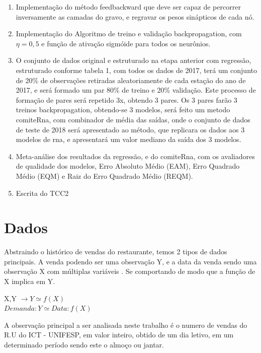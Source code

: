 \documentclass[	12pt, Times, openright, twoside, a4paper, english, brazil]{abntex2}
\begin{document}
\begin{enumerate}
    \item Implementação do método feedbackward que deve ser capaz de percorrer inversamente as camadas do gravo, e regravar os pesos sinápticos de cada nó.

    \item Implementação do Algoritmo de treino e validação backpropagation, com $\eta = 0,5$ e função de ativação sigmóide para todos os neurônios.

    \item O conjunto de dados original e estruturado na etapa anterior com regressão, estruturado conforme tabela 1, com todos os dados de 2017, terá um conjunto de 20\% de observações retiradas aleatoriamente de cada estação do ano de 2017, e será formado um par 80\% de treino e 20\% validação. Este processo de formação de pares será repetido 3x, obtendo 3 pares.
    Os 3 pares farão 3 treinos backpropagation, obtendo-se 3 modelos, será feito um metodo comiteRna, com combinador de média das saídas, onde o conjunto de dados de teste de 2018 será apresentado ao método, que replicara os dados aos 3 modelos de rna, e apresentará um valor mediano da saída dos 3 modelos.
    
    \item Meta-análise dos resultados da regressão, e do comiteRna, com os avaliadores de qualidade dos modelos, Erro Absoluto Médio (EAM), Erro Quadrado Médio (EQM) e Raiz do Erro Quadrado Médio (REQM).
    
    \item Escrita do TCC2

    \end{enumerate}
	
	\section{Dados}
	Abstraindo o histórico de vendas do restaurante, temos 2 tipos de dados principais. A venda podendo ser uma observação Y, e a data da venda sendo uma observação X com múltiplas variáveis . Se comportando de modo que a função de X implica em Y. 
	
	X,Y $\rightarrow Y \simeq f(X) $\\
	$ Demanda:Y \simeq Data:f(X) $
	
	A observação principal a ser analisada neste trabalho é o numero de vendas do R.U do ICT - UNIFESP, em valor inteiro, obtido de um dia letivo, em um determinado período sendo este o almoço ou jantar.
	
\end{document}

